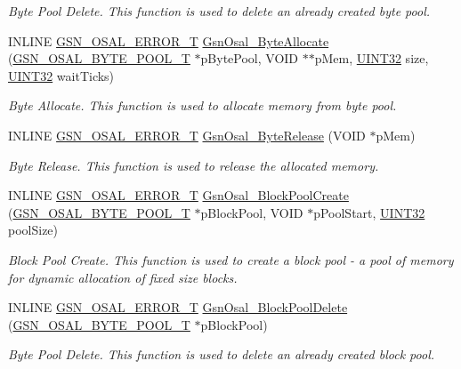 \begin{DoxyCompactItemize}
\begin{DoxyCompactList}\small\item\em Byte Pool Delete. This function is used to delete an already created byte pool. \end{DoxyCompactList}\item 
INLINE \hyperlink{a00659_ga36216a7aacd1d5024bc7b8bf39c3f46b}{GSN\_\-OSAL\_\-ERROR\_\-T} \hyperlink{a00628_ga1d70fb063bb88ee4ac9fa2c2260afeb9}{GsnOsal\_\-ByteAllocate} (\hyperlink{a00628_gaf2af06408f9cf286dc400b5957264f00}{GSN\_\-OSAL\_\-BYTE\_\-POOL\_\-T} $\ast$pBytePool, VOID $\ast$$\ast$pMem, \hyperlink{a00660_gae1e6edbbc26d6fbc71a90190d0266018}{UINT32} size, \hyperlink{a00660_gae1e6edbbc26d6fbc71a90190d0266018}{UINT32} waitTicks)
\begin{DoxyCompactList}\small\item\em Byte Allocate. This function is used to allocate memory from byte pool. \end{DoxyCompactList}\item 
INLINE \hyperlink{a00659_ga36216a7aacd1d5024bc7b8bf39c3f46b}{GSN\_\-OSAL\_\-ERROR\_\-T} \hyperlink{a00628_ga278d0c8b448a24f26c2359b7830c0da2}{GsnOsal\_\-ByteRelease} (VOID $\ast$pMem)
\begin{DoxyCompactList}\small\item\em Byte Release. This function is used to release the allocated memory. \end{DoxyCompactList}\item 
INLINE \hyperlink{a00659_ga36216a7aacd1d5024bc7b8bf39c3f46b}{GSN\_\-OSAL\_\-ERROR\_\-T} \hyperlink{a00628_gafa441a8b3321c0f612fbedbe4a897a49}{GsnOsal\_\-BlockPoolCreate} (\hyperlink{a00628_gaf2af06408f9cf286dc400b5957264f00}{GSN\_\-OSAL\_\-BYTE\_\-POOL\_\-T} $\ast$pBlockPool, VOID $\ast$pPoolStart, \hyperlink{a00660_gae1e6edbbc26d6fbc71a90190d0266018}{UINT32} poolSize)
\begin{DoxyCompactList}\small\item\em Block Pool Create. This function is used to create a block pool -\/ a pool of memory for dynamic allocation of fixed size blocks. \end{DoxyCompactList}\item 
INLINE \hyperlink{a00659_ga36216a7aacd1d5024bc7b8bf39c3f46b}{GSN\_\-OSAL\_\-ERROR\_\-T} \hyperlink{a00628_gaf64e15fd3f730913bdc47d6d237a0ef4}{GsnOsal\_\-BlockPoolDelete} (\hyperlink{a00628_gaf2af06408f9cf286dc400b5957264f00}{GSN\_\-OSAL\_\-BYTE\_\-POOL\_\-T} $\ast$pBlockPool)
\begin{DoxyCompactList}\small\item\em Byte Pool Delete. This function is used to delete an already created block pool. \end{DoxyCompactList}\item 
$$
\end{DoxyCompactItemize}
